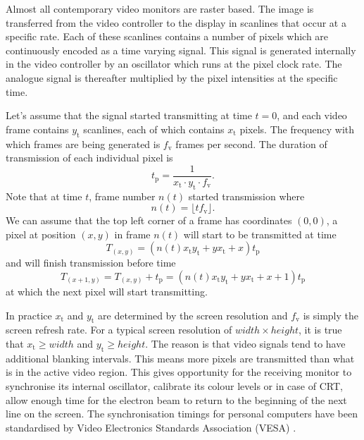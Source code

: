 \documentclass[a4paper,12pt,twoside,openright]{report}
\begin{document}
Almost all contemporary video monitors are raster based. The image is transferred from the video controller to the display in scanlines that occur at a specific rate. Each of these scanlines contains a number of pixels which are continuously encoded as a time varying signal. This signal is generated internally in the video controller by an oscillator which runs at the pixel clock rate. The analogue signal is thereafter multiplied by the pixel intensities at the specific time.

Let's assume that the signal started transmitting at time $t=0$, and each video frame contains $y_\text{t}$ scanlines, each of which contains $x_\text{t}$ pixels. The frequency with which frames are being generated is $f_\text{v}$ frames per second. The duration of transmission of each individual pixel is \begin{equation}
\label{eq:tdelta_definition}
t_\text{p}=\frac{1}{x_\text{t} \cdot y_\text{t} \cdot f_\text{v}} .
\end{equation}
Note that at time $t$, frame number $n(t)$ started transmission where 
\begin{equation}
n(t)=\lfloor t f_\text{v} \rfloor .
\end{equation}
We can assume that the top left corner of a frame has coordinates $(0, 0)$, a pixel at position $(x, y)$ in frame $n(t)$ will start to be transmitted at time
\begin{equation}
T_{(x,y)}= (n(t) x_\text{t} y_\text{t} + y x_\text{t} + x) t_\text{p}
\end{equation}
and will finish transmission before time 
\begin{equation}
T_{(x+1,y)} = T_{(x,y)} + t_\text{p} =(n(t) x_\text{t} y_\text{t} + y x_\text{t} + x + 1) t_\text{p}
\end{equation}
at which the next pixel will start transmitting.

In practice $x_\text{t}$ and $y_\text{t}$ are determined by the screen resolution and $f_\text{v}$ is simply the screen refresh rate. For a typical screen resolution of $width \times height$, it is true that $x_\text{t} \geq width$ and $y_\text{t} \geq height$. The reason is that video signals tend to have additional blanking intervals. This means more pixels are transmitted than what is in the active video region. This gives opportunity for the receiving monitor to synchronise its internal oscillator, calibrate its colour levels or in case of CRT, allow enough time for the electron beam to return to the beginning of the next line on the screen. The synchronisation timings for personal computers have been standardised by Video Electronics Standards Association (VESA) \cite{vesa}.
\end{document}

